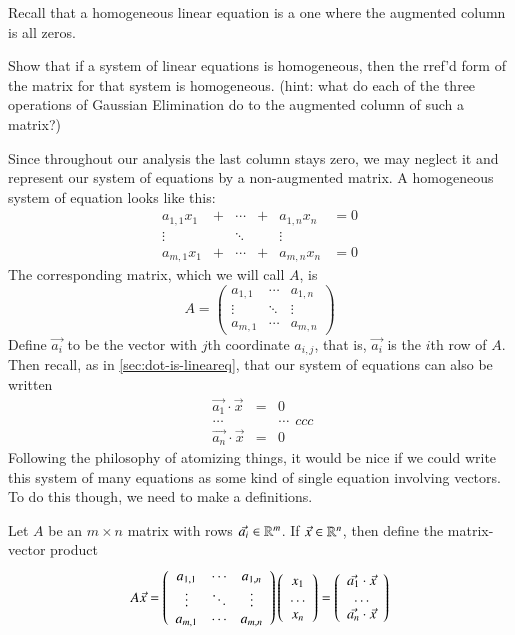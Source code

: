 \documentclass[Main.tex]{subfiles}
\begin{document}
Recall that a homogeneous linear equation is a one where the augmented column is all zeros.  
\begin{EasyEx}
  Show that if a system of linear equations is homogeneous, then the rref'd form of the matrix for that system is homogeneous.  
  (hint: what do each of the three operations of Gaussian Elimination do to the augmented column of such a matrix?)
\end{EasyEx}
Since throughout our analysis the last column stays zero, we may neglect it and represent our system of equations by a non-augmented matrix.  
A homogeneous system of equation looks like this:
\[\begin{array}{ccccccc}
  a_{1,1}x_1 & + & \cdots & + & a_{1,n}x_n  & = 0\\
  \vdots     &   & \ddots &   & \vdots     \\
  a_{m,1}x_1 & + & \cdots & + & a_{m,n}x_n & = 0
\end{array}\]
The corresponding matrix, which we will call $A$, is
\[A=\left(\begin{array}{cccc}
  a_{1,1} &  \cdots & a_{1,n}\\
  \vdots     & \ddots  & \vdots\\
  a_{m,1} & \cdots  & a_{m,n}
\end{array}\right)\]
Define $\vec{a_i}$ to be the vector with $j$th coordinate $a_{i,j}$, that is, $\vec{a_i}$ is the $i$th row of $A$.
Then recall, as in \ref{sec:dot-is-lineareq}, that our system of equations can also be written
\[\begin{array}{ccc}
  \vec{a_1}\cdot\vec{x} & = & 0\\
  \hdots &&\hdots\\
  \vec{a_n}\cdot\vec{x} & = & 0
\end{array}{ccc}\]
Following the philosophy of atomizing things, it would be nice if we could write this system of many equations as some kind of single equation involving vectors.
To do this though, we need to make a definitions.
\begin{Def}
  Let $A$ be an $m\times n$ matrix with rows $\vec{a_i}\in\mathbb{R}^m$.
  If $\vec{x}\in\mathbb{R}^n$, then define the matrix-vector product
  \[A\vec{x} = \left(\begin{array}{cccc}
  a_{1,1} &  \cdots & a_{1,n}\\
  \vdots     & \ddots  & \vdots\\
  a_{m,1} & \cdots  & a_{m,n}
\end{array}\right)\left(\begin{array}{c}x_1\\ \hdots\\x_n\end{array}\right) = 
\left(\begin{array}{c}\vec{a_1}\cdot\vec{x}\\
  \hdots\\
  \vec{a_n}\cdot\vec{x}\end{array}\right)\]
\end{Def}
\end{document}
